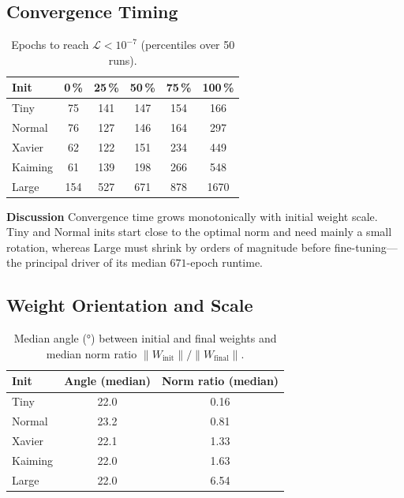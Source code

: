 \subsection*{Convergence Timing}

\begin{table}[h]
\centering
\caption{Epochs to reach $\mathcal L<10^{-7}$ (percentiles over 50 runs).}
\label{tab:abs1-init-epochs}
\begin{tabular}{lccccc}
\toprule
Init & 0\,\% & 25\,\% & 50\,\% & 75\,\% & 100\,\% \\
\midrule
Tiny    & 75  & 141 & 147 & 154 & 166 \\
Normal  & 76  & 127 & 146 & 164 & 297 \\
Xavier  & 62  & 122 & 151 & 234 & 449 \\
Kaiming & 61  & 139 & 198 & 266 & 548 \\
Large   & 154 & 527 & 671 & 878 & 1670 \\
\bottomrule
\end{tabular}
\end{table}

\textbf{Discussion}  
Convergence time grows monotonically with initial weight scale.  Tiny and
Normal inits start close to the optimal norm and need mainly a small rotation,
whereas Large must shrink by orders of magnitude before fine-tuning—the
principal driver of its median $671$-epoch runtime.

\subsection*{Weight Orientation and Scale}

\begin{table}[h]
\centering
\caption{Median angle (°) between initial and final weights and median
norm ratio $\lVert W_{\text{init}}\rVert / \lVert W_{\text{final}}\rVert$.}
\label{tab:abs1-init-angle-norm}
\begin{tabular}{lcc}
\toprule
Init & Angle (median) & Norm ratio (median) \\
\midrule
Tiny    & 22.0 & 0.16 \\
Normal  & 23.2 & 0.81 \\
Xavier  & 22.1 & 1.33 \\
Kaiming & 22.0 & 1.63 \\
Large   & 22.0 & 6.54 \\
\bottomrule
\end{tabular}
\end{table}

